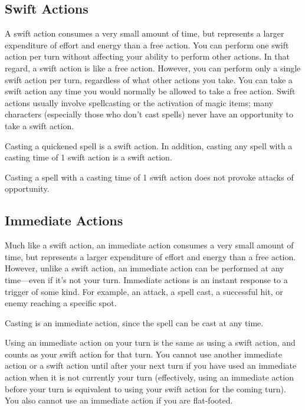 \subsection{Swift Actions}
A swift action consumes a very small amount of time, but represents a larger expenditure of effort and energy than a free action. You can perform one swift action per turn without affecting your ability to perform other actions. In that regard, a swift action is like a free action. However, you can perform only a single swift action per turn, regardless of what other actions you take. You can take a swift action any time you would normally be allowed to take a free action. Swift actions usually involve spellcasting or the activation of magic items; many characters (especially those who don't cast spells) never have an opportunity to take a swift action.

Casting a quickened spell is a swift action. In addition, casting any spell with a casting time of 1 swift action is a swift action.

Casting a spell with a casting time of 1 swift action does not provoke attacks of opportunity.

\subsection{Immediate Actions}
Much like a swift action, an immediate action consumes a very small amount of time, but represents a larger expenditure of effort and energy than a free action. However, unlike a swift action, an immediate action can be performed at any time---even if it's not your turn. Immediate actions is an instant response to a trigger of some kind. For example, an attack, a spell cast, a successful hit, or enemy reaching a specific spot.

Casting  is an immediate action, since the spell can be cast at any time.

Using an immediate action on your turn is the same as using a swift action, and counts as your swift action for that turn. You cannot use another immediate action or a swift action until after your next turn if you have used an immediate action when it is not currently your turn (effectively, using an immediate action before your turn is equivalent to using your swift action for the coming turn). You also cannot use an immediate action if you are flat-footed.


